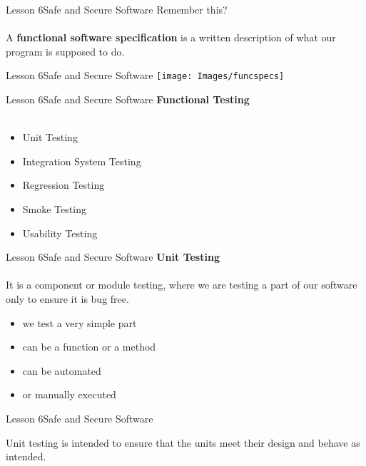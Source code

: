 \documentclass[aspectratio=1610]{beamer}
\begin{document}
\begin{frame}{Lesson 6}{Safe and Secure Software}
\huge
Remember this?\\~\\
A \textbf{functional software specification} is a \alert{written} description of what 
our program is supposed to do.
\end{frame}


\begin{frame}{Lesson 6}{Safe and Secure Software}
\texttt{[image: Images/funcspecs]}
\end{frame}


\begin{frame}{Lesson 6}{Safe and Secure Software}
\LARGE
\textbf{Functional Testing}\\~\\ 
\begin{itemize}
    \item Unit Testing
    \item Integration System Testing
    \item Regression Testing
    \item Smoke Testing
    \item Usability Testing
\end{itemize}
\end{frame}



\begin{frame}{Lesson 6}{Safe and Secure Software}
\LARGE
\textbf{Unit Testing}\\~\\ 
It is a component or module testing, where we are testing a part of our software only 
to ensure it is bug free. 
\begin{itemize}
    \item we test a very simple part
    \item can be a function or a method
    \item can be automated 
    \item or manually executed
\end{itemize}
\end{frame}


\begin{frame}{Lesson 6}{Safe and Secure Software}
\Huge
\begin{center}
Unit testing is intended to ensure that the units meet their design and behave as 
intended. 
\end{center}
\end{frame}
\end{document}
